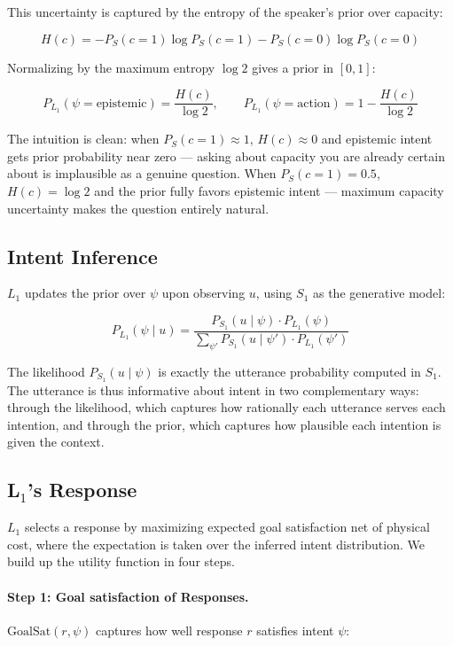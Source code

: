\documentclass[12pt]{article}
\begin{document}
This uncertainty is captured by the entropy of the speaker's prior over
capacity:

\[
H(c) = -P_S(c=1)\log P_S(c=1) - P_S(c=0)\log P_S(c=0)
\]

Normalizing by the maximum entropy $\log 2$ gives a prior in $[0,1]$:

\[
P_{L_1}(\psi = \text{epistemic}) = \frac{H(c)}{\log 2},
\qquad
P_{L_1}(\psi = \text{action}) = 1 - \frac{H(c)}{\log 2}
\]

The intuition is clean: when $P_S(c=1) \approx 1$, $H(c) \approx 0$
and epistemic intent gets prior probability near zero --- asking about
capacity you are already certain about is implausible as a genuine
question. When $P_S(c=1) = 0.5$, $H(c) = \log 2$ and the prior fully
favors epistemic intent --- maximum capacity uncertainty makes the
question entirely natural.

\subsection{Intent Inference}

$L_1$ updates the prior over $\psi$ upon observing $u$, using $S_1$ as
the generative model:

\[
P_{L_1}(\psi \mid u)
= \frac{P_{S_1}(u \mid \psi) \cdot P_{L_1}(\psi)}
  {\displaystyle\sum_{\psi'} P_{S_1}(u \mid \psi')
  \cdot P_{L_1}(\psi')}
\]

The likelihood $P_{S_1}(u \mid \psi)$ is exactly the utterance
probability computed in $S_1$. The utterance is thus informative about
intent in two complementary ways: through the likelihood, which
captures how rationally each utterance serves each intention, and
through the prior, which captures how plausible each intention is given
the context.

\subsection{L$_1$'s Response}

$L_1$ selects a response by maximizing expected goal satisfaction net
of physical cost, where the expectation is taken over the inferred
intent distribution. We build up the utility function in four steps.

\paragraph{Step 1: Goal satisfaction of Responses.}

$\text{GoalSat}(r, \psi)$ captures how well response $r$ satisfies
intent $\psi$:
\end{document}
